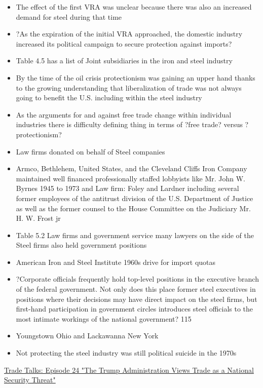 \documentclass[10pt]{article}
\begin{document}
\begin{itemize}
  \item The effect of the first VRA was unclear because there was also an increased demand for steel during that time
  \item ?As the expiration of the initial VRA approached, the domestic industry increased its political campaign to secure protection against imports?
  \item Table 4.5 has a list of Joint subsidiaries in the iron and steel industry
  \item By the time of the oil crisis protectionism was gaining an upper hand thanks to the growing understanding that liberalization of trade was not always going to benefit the U.S. including within the steel industry
  \item As the arguments for and against free trade change within individual industries there is difficulty defining thing in terms of ?free trade? versus ?protectionism?
  \item Law firms donated on behalf of Steel companies 
  \item Armco, Bethlehem, United States, and the Cleveland Cliffs Iron Company maintained well financed professionally staffed lobbyists like Mr. John W. Byrnes 1945 to 1973 and Law firm: Foley and Lardner including several former employees of the antitrust division of the U.S. Department of Justice as well as the former counsel to the House Committee on the Judiciary Mr. H. W. Frost jr
  \item Table 5.2 Law firms and government service many lawyers on the side of the Steel firms also held government positions 
  \item American Iron and Steel Institute 1960s drive for import quotas 
  \item ?Corporate officials frequently hold top-level positions in the executive branch of the federal government. Not only does this place former steel executives in positions where their decisions may have direct impact on the steel firms, but first-hand participation in government circles introduces steel officials to the most intimate workings of the national government? 115
  \item Youngstown Ohio and Lackawanna New York
  \item Not protecting the steel industry was still political suicide in the 1970s
\end{itemize}
\normalsize\underline{Trade Talks: Episode 24 "The Trump Administration Views Trade as a National Security Threat"}\\
\end{document}
